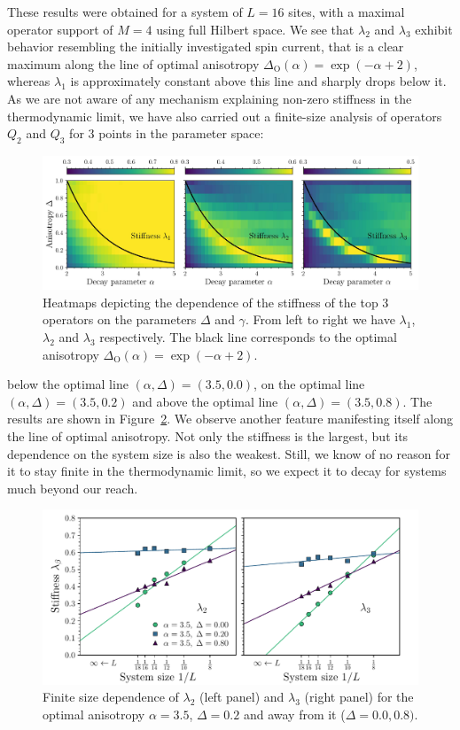 These results were obtained for a system of \(L=16\) sites, with a maximal operator support of \(M=4\) using full Hilbert space.
We see that \(\lambda_2\) and \(\lambda_3\) exhibit behavior resembling the initially investigated spin current,
that is a clear maximum along the line of optimal anisotropy \(\Delta_{\mathrm{O}}(\alpha) = \exp(-\alpha + 2)\),
whereas \(\lambda_1\) is approximately constant above this line and sharply drops below it.
As we are not aware of any mechanism explaining non-zero stiffness in the thermodynamic limit, we
have also carried out a finite-size analysis of operators \(Q_2\) and \(Q_3\) for 3 points in the parameter space:
\begin{figure}[H]
  \centering
  \includegraphics[width=\linewidth]{Figures/stiffness.jpg}
  \caption{Heatmaps depicting the dependence of the stiffness of the top 3 operators on the parameters \(\Delta\) and \(\gamma\).
    From left to right we have \(\lambda_1\), \(\lambda_2\) and \(\lambda_3\) respectively. The black line corresponds
    to the optimal anisotropy \(\Delta_{\mathrm{O} }(\alpha) = \exp(-\alpha + 2)\).}
  \label{fig:stiffness}
\end{figure}
\noindent below the optimal line \((\alpha,\Delta) = (3.5,0.0)\), on the optimal line \((\alpha,\Delta) = (3.5,0.2)\) and
above the optimal line \((\alpha,\Delta) = (3.5,0.8)\). The results are shown in Figure~\ref{fig:stiffness_finite_size}.
We observe another feature manifesting itself along the line of optimal anisotropy. Not only
the stiffness is the largest, but its dependence on the system size is also the weakest. Still,
we know of no reason for it to stay finite in the thermodynamic limit, so we expect it to
decay for systems much beyond our reach.
\begin{figure}[htbp]
  \centering
  \includegraphics[width=0.8\linewidth]{Figures/finite_size.pdf}
  \caption{Finite size dependence of \(\lambda_2\) (left panel) and \(\lambda_3\) (right panel) for the
    optimal anisotropy \(\alpha = 3.5\), \(\Delta = 0.2\) and away from it (\(\Delta = 0.0,0.8)\).}
  \label{fig:stiffness_finite_size}
\end{figure}
